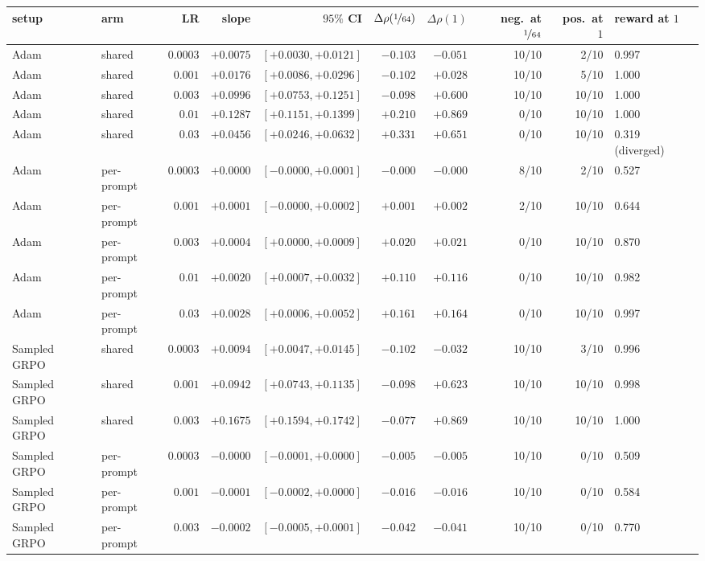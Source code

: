 \scriptsize\setlength{\tabcolsep}{2pt}
\begin{tabular}{llrrrrrrrl}
\toprule
setup & arm & LR & slope & $95\%$ CI & $\Delta\rho(\nicefrac1{64})$ & $\Delta\rho(1)$ & neg.\ at $\nicefrac1{64}$ & pos.\ at $1$ & reward at $1$ \\
\midrule
Adam & shared & $0.0003$ & $+0.0075$ & $[+0.0030, +0.0121]$ & $-0.103$ & $-0.051$ & 10/10 & 2/10 & 0.997 \\
Adam & shared & $0.001$ & $+0.0176$ & $[+0.0086, +0.0296]$ & $-0.102$ & $+0.028$ & 10/10 & 5/10 & 1.000 \\
Adam & shared & $0.003$ & $+0.0996$ & $[+0.0753, +0.1251]$ & $-0.098$ & $+0.600$ & 10/10 & 10/10 & 1.000 \\
Adam & shared & $0.01$ & $+0.1287$ & $[+0.1151, +0.1399]$ & $+0.210$ & $+0.869$ & 0/10 & 10/10 & 1.000 \\
Adam & shared & $0.03$ & $+0.0456$ & $[+0.0246, +0.0632]$ & $+0.331$ & $+0.651$ & 0/10 & 10/10 & 0.319 (diverged) \\
Adam & per-prompt & $0.0003$ & $+0.0000$ & $[-0.0000, +0.0001]$ & $-0.000$ & $-0.000$ & 8/10 & 2/10 & 0.527 \\
Adam & per-prompt & $0.001$ & $+0.0001$ & $[-0.0000, +0.0002]$ & $+0.001$ & $+0.002$ & 2/10 & 10/10 & 0.644 \\
Adam & per-prompt & $0.003$ & $+0.0004$ & $[+0.0000, +0.0009]$ & $+0.020$ & $+0.021$ & 0/10 & 10/10 & 0.870 \\
Adam & per-prompt & $0.01$ & $+0.0020$ & $[+0.0007, +0.0032]$ & $+0.110$ & $+0.116$ & 0/10 & 10/10 & 0.982 \\
Adam & per-prompt & $0.03$ & $+0.0028$ & $[+0.0006, +0.0052]$ & $+0.161$ & $+0.164$ & 0/10 & 10/10 & 0.997 \\
Sampled GRPO & shared & $0.0003$ & $+0.0094$ & $[+0.0047, +0.0145]$ & $-0.102$ & $-0.032$ & 10/10 & 3/10 & 0.996 \\
Sampled GRPO & shared & $0.001$ & $+0.0942$ & $[+0.0743, +0.1135]$ & $-0.098$ & $+0.623$ & 10/10 & 10/10 & 0.998 \\
Sampled GRPO & shared & $0.003$ & $+0.1675$ & $[+0.1594, +0.1742]$ & $-0.077$ & $+0.869$ & 10/10 & 10/10 & 1.000 \\
Sampled GRPO & per-prompt & $0.0003$ & $-0.0000$ & $[-0.0001, +0.0000]$ & $-0.005$ & $-0.005$ & 10/10 & 0/10 & 0.509 \\
Sampled GRPO & per-prompt & $0.001$ & $-0.0001$ & $[-0.0002, +0.0000]$ & $-0.016$ & $-0.016$ & 10/10 & 0/10 & 0.584 \\
Sampled GRPO & per-prompt & $0.003$ & $-0.0002$ & $[-0.0005, +0.0001]$ & $-0.042$ & $-0.041$ & 10/10 & 0/10 & 0.770 \\

\end{tabular}
